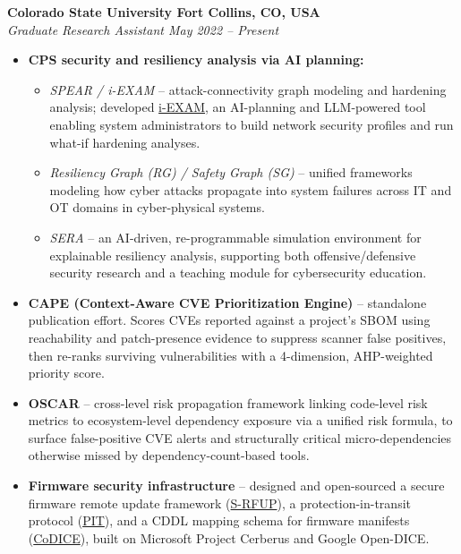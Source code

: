 \documentclass[11pt, a4paper]{article}
\begin{document}
\medskip
{\fontsize{10.87}{13.5}\selectfont
\textbf{\color{cvred} Colorado State University \hfill Fort Collins, CO, USA}\\
\textit{Graduate Research Assistant \hfill May 2022 -- Present}

\begin{itemize}[leftmargin=*, itemsep=2pt, topsep=2pt]
  \item \textbf{CPS security and resiliency analysis via AI planning:}
  \begin{itemize}[leftmargin=*, itemsep=2pt, topsep=1pt]
    \item \textit{SPEAR / i-EXAM} -- attack-connectivity graph modeling and hardening analysis; developed \href{https://huggingface.co/spaces/CryptoKnight007/i-EXAM}{i-EXAM}, an AI-planning and LLM-powered tool enabling system administrators to build network security profiles and run what-if hardening analyses.
    \item \textit{Resiliency Graph (RG) / Safety Graph (SG)} -- unified frameworks modeling how cyber attacks propagate into system failures across IT and OT domains in cyber-physical systems.
    \item \textit{SERA} -- an AI-driven, re-programmable simulation environment for explainable resiliency analysis, supporting both offensive/defensive security research and a teaching module for cybersecurity education.
  \end{itemize}
  \item \textbf{CAPE (Context-Aware CVE Prioritization Engine)} -- standalone publication effort. Scores CVEs reported against a project's SBOM using reachability and patch-presence evidence to suppress scanner false positives, then re-ranks surviving vulnerabilities with a 4-dimension, AHP-weighted priority score.
  \item \textbf{OSCAR} -- cross-level risk propagation framework linking code-level risk metrics to ecosystem-level dependency exposure via a unified risk formula, to surface false-positive CVE alerts and structurally critical micro-dependencies otherwise missed by dependency-count-based tools.
  \item \textbf{Firmware security infrastructure} -- designed and open-sourced a secure firmware remote update framework (\href{https://github.com/AMIProject0/Project-Cerberus-PLDM}{S-RFUP}), a protection-in-transit protocol (\href{https://github.com/cryptoknight13/PIT-Cerberus}{PIT}), and a CDDL mapping schema for firmware manifests (\href{https://github.com/cryptoknight13/CoDICE-Framework}{CoDICE}), built on Microsoft Project Cerberus and Google Open-DICE.
\end{itemize}
}
\end{document}
